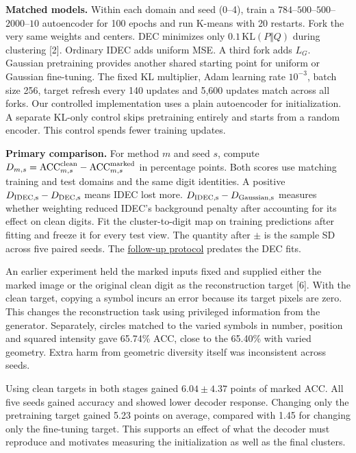 \textbf{Matched models.} Within each domain and seed (0--4), train a $784$--$500$--$500$--$2000$--$10$ autoencoder for 100 epochs and run K-means with 20 restarts. Fork the very same weights and centers. DEC minimizes only $0.1\,\mathrm{KL}(P\Vert Q)$ during clustering [2]. Ordinary IDEC adds uniform MSE. A third fork adds $L_G$. Gaussian pretraining provides another shared starting point for uniform or Gaussian fine-tuning. The fixed KL multiplier, Adam learning rate $10^{-3}$, batch size 256, target refresh every 140 updates and 5,600 updates match across all forks. Our controlled implementation uses a plain autoencoder for initialization. A separate KL-only control skips pretraining entirely and starts from a random encoder. This control spends fewer training updates.

\textbf{Primary comparison.} For method $m$ and seed $s$, compute $D_{m,s}=\mathrm{ACC}_{m,s}^{\rm clean}-\mathrm{ACC}_{m,s}^{\rm marked}$ in percentage points. Both scores use matching training and test domains and the same digit identities. A positive $D_{\rm IDEC,s}-D_{\rm DEC,s}$ means IDEC lost more. $D_{\rm IDEC,s}-D_{\rm Gaussian,s}$ measures whether weighting reduced IDEC's background penalty after accounting for its effect on clean digits. Fit the cluster-to-digit map on training predictions after fitting and freeze it for every test view. The quantity after $\pm$ is the sample SD across five paired seeds. The \href{https://github.com/JohnR31N/cs126FinalProj/blob/7e753dd/IDEC/dec_background/design.md}{follow-up protocol} predates the DEC fits.

An earlier experiment held the marked inputs fixed and supplied either the marked image or the original clean digit as the reconstruction target [6]. With the clean target, copying a symbol incurs an error because its target pixels are zero. This changes the reconstruction task using privileged information from the generator. Separately, circles matched to the varied symbols in number, position and squared intensity gave 65.74\% ACC, close to the 65.40\% with varied geometry. Extra harm from geometric diversity itself was inconsistent across seeds.

\begin{center}\small\end{center}
Using clean targets in both stages gained $6.04\pm4.37$ points of marked ACC. All five seeds gained accuracy and showed lower decoder response. Changing only the pretraining target gained 5.23 points on average, compared with 1.45 for changing only the fine-tuning target. This supports an effect of what the decoder must reproduce and motivates measuring the initialization as well as the final clusters.

